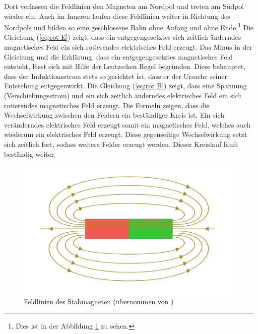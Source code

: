 Dort verlassen die Feldlinien den Magneten am Nordpol und treten am Südpol wieder ein.
Auch im Inneren laufen diese Feldlinien weiter in Richtung des Nordpols und bilden so eine geschlossene Bahn ohne Anfang und ohne Ende.\footnote{Dies ist in der Abbildung \ref{fig:stabm} zu sehen.}
Die Gleichung (\ref{eq:rot E}) zeigt, dass ein entgegengesetztes sich zeitlich änderndes magnetisches Feld ein sich rotierendes elektrisches Feld erzeugt.
Das Minus in der Gleichung und die Erklärung, dass ein entgegengesetztes magnetisches Feld entsteht, lässt sich mit Hilfe der Lentzschen Regel begründen.
Diese behauptet, dass der Induktionsstrom stets so gerichtet ist, dass er der Ursache seiner Entstehung entgegenwirkt.
Die Gleichung (\ref{eq:rot B}) zeigt, dass eine Spannung (Verschiebungsstrom) und ein sich zeitlich änderndes elektrisches Feld ein sich rotierendes magnetisches Feld erzeugt.
Die Formeln zeigen, dass die Wechselwirkung zwischen den Feldern ein beständiger Kreis ist. 
Ein sich veränderndes elektrisches Feld erzeugt somit ein magnetisches Feld, welches auch wiederum ein elektrisches Feld erzeugt.
Diese gegenseitige Wechselwirkung setzt sich zeitlich fort, sodass weitere Felder erzeugt werden.
Dieser Kreislauf läuft beständig weiter.

\begin{figure}[h]
    \centering
    \includegraphics[width=.9\textwidth]{fig/feldlinien-stabmagnet (1).png}
    \caption{Feldlinien des Stabmagneten (übernommen von \cite{Stabmagnet})}
    \label{fig:stabm}
\end{figure}
